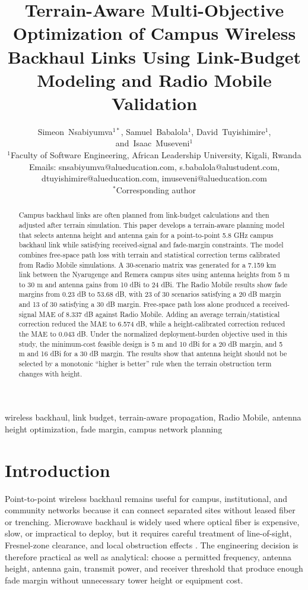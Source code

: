 \documentclass[journal]{IEEEtran}
\title{Terrain-Aware Multi-Objective Optimization of Campus Wireless Backhaul Links Using Link-Budget Modeling and Radio Mobile Validation}
\author{Simeon~Nsabiyumva$^{1*}$,
Samuel~Babalola$^{1}$,
David~Tuyishimire$^{1}$,
and~Isaac~Museveni$^{1}$\\
$^{1}$Faculty of Software Engineering, African Leadership University, Kigali, Rwanda\\
Emails: snsabiyumva@alueducation.com, s.babalola@alustudent.com, dtuyishimire@alueducation.com, imuseveni@alueducation.com\\
$^{*}$Corresponding author}
\begin{document}
\maketitle

\begin{abstract}
Campus backhaul links are often planned from link-budget calculations and then adjusted after terrain simulation. This paper develops a terrain-aware planning model that selects antenna height and antenna gain for a point-to-point 5.8 GHz campus backhaul link while satisfying received-signal and fade-margin constraints. The model combines free-space path loss with terrain and statistical correction terms calibrated from Radio Mobile simulations. A 30-scenario matrix was generated for a 7.159 km link between the Nyarugenge and Remera campus sites using antenna heights from 5 m to 30 m and antenna gains from 10 dBi to 24 dBi. The Radio Mobile results show fade margins from 0.23 dB to 53.68 dB, with 23 of 30 scenarios satisfying a 20 dB margin and 13 of 30 satisfying a 30 dB margin. Free-space path loss alone produced a received-signal MAE of 8.337 dB against Radio Mobile. Adding an average terrain/statistical correction reduced the MAE to 6.574 dB, while a height-calibrated correction reduced the MAE to 0.043 dB. Under the normalized deployment-burden objective used in this study, the minimum-cost feasible design is 5 m and 10 dBi for a 20 dB margin, and 5 m and 16 dBi for a 30 dB margin. The results show that antenna height should not be selected by a monotonic ``higher is better'' rule when the terrain obstruction term changes with height.
\end{abstract}

\begin{IEEEkeywords}
wireless backhaul, link budget, terrain-aware propagation, Radio Mobile, antenna height optimization, fade margin, campus network planning
\end{IEEEkeywords}

\section{Introduction}

Point-to-point wireless backhaul remains useful for campus, institutional, and community networks because it can connect separated sites without leased fiber or trenching. Microwave backhaul is widely used where optical fiber is expensive, slow, or impractical to deploy, but it requires careful treatment of line-of-sight, Fresnel-zone clearance, and local obstruction effects \cite{brown2023planning}. The engineering decision is therefore practical as well as analytical: choose a permitted frequency, antenna height, antenna gain, transmit power, and receiver threshold that produce enough fade margin without unnecessary tower height or equipment cost.
\end{document}
